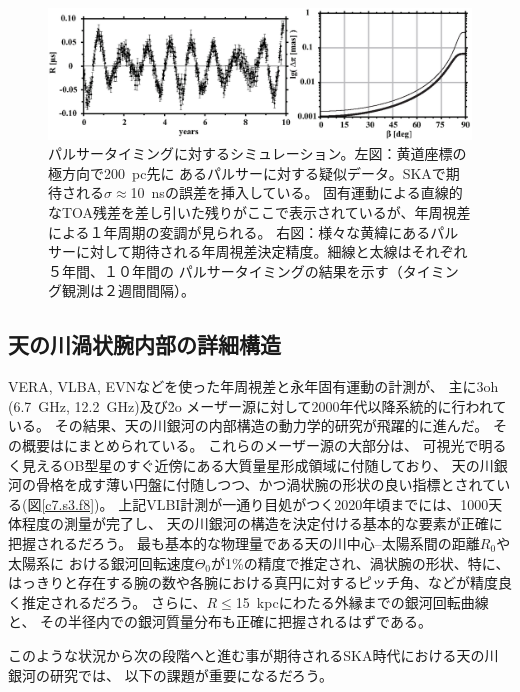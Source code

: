 \begin{figure}[t]
\includegraphics[width=1.0\linewidth]{astrometry/SKA_pulsars_simulation_2011.eps} \vspace*{-3mm}
\caption{パルサータイミングに対するシミュレーション\citep{2011A&A...528A.108S}。左図：黄道座標の極方向で200~pc先に
あるパルサーに対する疑似データ。SKAで期待される$\sigma\approx$10~nsの誤差を挿入している。
固有運動による直線的なTOA残差を差し引いた残りがここで表示されているが、年周視差による１年周期の変調が見られる。
右図：様々な黄緯にあるパルサーに対して期待される年周視差決定精度。細線と太線はそれぞれ５年間、１０年間の
パルサータイミングの結果を示す（タイミング観測は２週間間隔）。}
\label{c7.s3.f7}
\end{figure}


\setcounter{subsection}{1}\subsection{天の川渦状腕内部の詳細構造}\label{c7.s3.ss2}

VERA, VLBA, EVNなどを使った年周視差と永年固有運動の計測が、
主に\ch3oh (6.7~GHz, 12.2~GHz)及び\h2o メーザー源に対して2000年代以降系統的に行われている。
その結果、天の川銀河の内部構造の動力学的研究が飛躍的に進んだ。
その概要は\citet{2014ARA&A..52..339R}にまとめられている。
これらのメーザー源の大部分は、
可視光で明るく見えるOB型星のすぐ近傍にある大質量星形成領域に付随しており、
天の川銀河の骨格を成す薄い円盤に付随しつつ、かつ渦状腕の形状の良い指標とされている(図\ref{c7.s3.f8})。
上記VLBI計測が一通り目処がつく2020年頃までには、1000天体程度の測量が完了し、
天の川銀河の構造を決定付ける基本的な要素が正確に把握されるだろう。
最も基本的な物理量である天の川中心--太陽系間の距離$R_0$や太陽系に
おける銀河回転速度$\Theta_0$が1\%の精度で推定され、渦状腕の形状、特に、
はっきりと存在する腕の数や各腕における真円に対するピッチ角、などが精度良く推定されるだろう。
さらに、$R\leq$15~kpcにわたる外縁までの銀河回転曲線と、
その半径内での銀河質量分布も正確に把握されるはずである。

このような状況から次の段階へと進む事が期待されるSKA時代における天の川銀河の研究では、
以下の課題が重要になるだろう。

